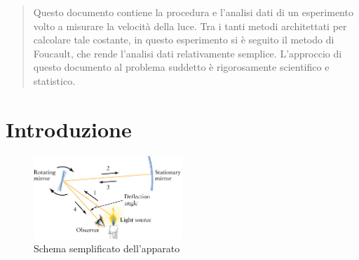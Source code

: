 \documentclass[a4paper,11pt]{article}
\begin{document}
	\begin{abstract}

	Questo documento contiene la procedura e l'analisi dati di un esperimento volto a misurare la velocità della luce. Tra i tanti metodi architettati per calcolare tale costante, in questo esperimento si è seguito il metodo di Foucault, che rende l'analisi dati relativamente semplice. L'approccio di questo documento al problema suddetto è rigorosamente scientifico e statistico.

	\end{abstract}

	\section{Introduzione}
	
	\begin{figure}
    	\centering
    	\includegraphics[width=0.5\textwidth]{Apparato}
    	
    	\label{apparato}
    	\caption{Schema semplificato dell'apparato}
	\end{figure}	
	
\end{document}
